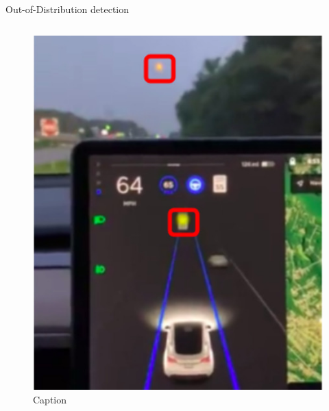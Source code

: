 \documentclass[aspectratio=169]{beamer}
\begin{document}
\begin{frame}{Out-of-Distribution detection}
\begin{columns}
\begin{column}{0.5\textwidth}
        \begin{figure}
            \centering
            \includegraphics[scale=0.25]{images/Tesla_ex_moon.jpg}
            \caption{Caption}
            \label{fig:eg_tesla_moon}
        \end{figure}
        \end{column}
    \end{columns}
\end{frame}
\end{document}
